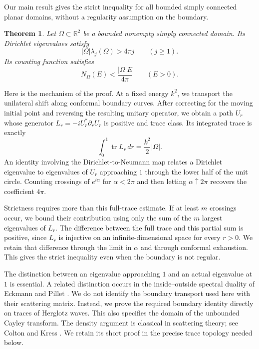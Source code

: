 \documentclass[11pt]{amsart}
\numberwithin{equation}{section}
\newtheorem{theorem}{Theorem}[section]
\newcommand{\tr}{\operatorname{tr}}
\begin{document}
Our main result gives the strict inequality for all bounded simply
connected planar domains, without a regularity assumption on the boundary.

\begin{theorem}\label{thm:main}
Let $\Omega\subset\mathbb R^2$ be a bounded nonempty simply connected
domain. Its Dirichlet eigenvalues satisfy
\begin{equation}\label{eq:strict-eigenvalues}
 |\Omega|\lambda_j(\Omega)>4\pi j\qquad(j\ge1).
\end{equation}
Its counting function satisfies
\begin{equation}\label{eq:polya}
 N_\Omega(E)<\frac{|\Omega|E}{4\pi}\qquad(E>0).
\end{equation}
\end{theorem}

Here is the mechanism of the proof. At a fixed energy $k^2$, we
transport the unilateral shift along conformal boundary curves.
After correcting for the moving initial point and reversing the
resulting unitary operator, we obtain a path $U_r$ whose generator
$L_r=-iU_r^*\partial_rU_r$ is positive and trace class. Its integrated
trace is exactly
\[
 \int_0^1\tr L_r\,dr=\frac{k^2}{2}|\Omega|.
\]
An identity involving the Dirichlet-to-Neumann map relates a
Dirichlet eigenvalue to eigenvalues of $U_r$ approaching $1$ through
the lower half of the unit circle. Counting crossings of $e^{i\alpha}$
for $\alpha<2\pi$ and then letting $\alpha\uparrow2\pi$ recovers
the coefficient $4\pi$.

Strictness requires more than this full-trace estimate. If at least
$m$ crossings occur, we bound their contribution using only the sum
of the $m$ largest eigenvalues of $L_r$. The difference between the
full trace and this partial sum is positive, since $L_r$ is injective
on an infinite-dimensional space for every $r>0$. We retain that
difference through the limit in $\alpha$ and through conformal
exhaustion. This gives the strict inequality even when the boundary
is not regular.

The distinction between an eigenvalue approaching $1$ and an actual
eigenvalue at $1$ is essential. A related distinction occurs in the
inside--outside spectral duality of Eckmann and Pillet \cite{EP}.
We do not identify the boundary transport used here with their
scattering matrix. Instead, we prove the required boundary identity
directly on traces of Herglotz waves. This also specifies the domain
of the unbounded Cayley transform. The density argument is classical
in scattering theory; see Colton and Kress \cite{CK}. We retain its
short proof in the precise trace topology needed below.
\end{document}
